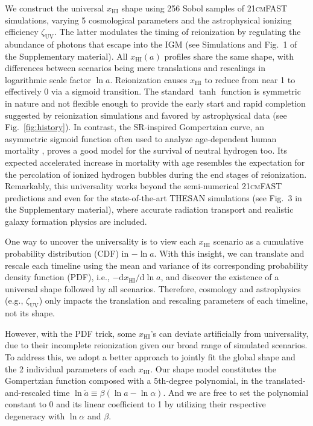\documentclass[12pt]{article}
\newcommand{\zetaUV}{\zeta_\mathrm{UV}}
\newcommand{\HI}{\mathrm{HI}}
\newcommand{\ap}{\alpha}
\newcommand{\tilt}{\beta}
\newcommand{\ar}{\tilde{a}}
\begin{document}
We construct the universal $x_\HI$ shape using 256 Sobol samples
of \textsc{21cmFAST} simulations, varying 5 cosmological parameters
and the astrophysical ionizing efficiency $\zetaUV$.
The latter modulates the timing of reionization by regulating the
abundance of photons that escape into the IGM (see Simulations
and Fig.~1 of the Supplementary material).
All $x_\HI(a)$ profiles share the same shape, with differences between
scenarios being mere translations and rescalings in logarithmic scale
factor $\ln a$.
Reionization causes $x_\HI$ to reduce from near 1 to effectively 0 via a
sigmoid transition.
The standard $\tanh$ function is symmetric in nature and not flexible
enough to provide the early start and rapid completion suggested by
reionization simulations \cite{Trac2018, Doussot2019} and favored by
astrophysical data (see Fig.~\ref{fig:history}).
In contrast, the SR-inspired Gompertzian curve, an asymmetric sigmoid
function often used to analyze age-dependent human mortality
\cite{Gompertz1825}, proves a good model for the survival of neutral
hydrogen too.
Its expected accelerated increase in mortality with age resembles the
expectation for the percolation of ionized hydrogen bubbles during the
end stages of reionization.
Remarkably, this universality works beyond the semi-numerical
\textsc{21cmFAST} predictions and even for the state-of-the-art THESAN
simulations \cite{Kannan2022} (see Fig.~3 in the
Supplementary material), where accurate radiation transport and realistic
galaxy formation physics are included.

One way to uncover the universality is to view each $x_\HI$ scenario as
a cumulative probability distribution (CDF) in $- \ln a$.
With this insight, we can translate and rescale each timeline using the
mean and variance of its corresponding probability density function
(PDF), i.e., $- \mathrm{d}x_\HI / \mathrm{d}\ln a$, and discover the
existence of a universal shape followed by all scenarios.
Therefore, cosmology and astrophysics (e.g., $\zetaUV$) only impacts the translation and
rescaling parameters of each timeline, not its shape.

However, with the PDF trick, some $x_\HI$'s can deviate artificially
from universality, due to their incomplete reionization given our broad
range of simulated scenarios.
To address this, we adopt a better approach to jointly fit the global
shape and the 2 individual parameters of each $x_\HI$.
Our shape model constitutes the Gompertzian function composed with a
5th-degree polynomial, in the translated-and-rescaled time $\ln\ar
\equiv \tilt (\ln a - \ln\ap)$.
And we are free to set the polynomial constant to 0 and its linear
coefficient to 1 by utilizing their respective degeneracy with $\ln\ap$
and $\tilt$.
\end{document}
